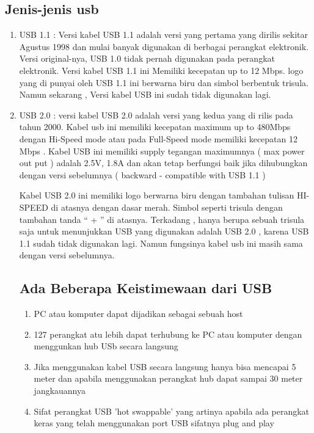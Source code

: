 \subsection {Jenis-jenis usb}
\begin {enumerate}
\item
	USB 1.1 : Versi kabel USB 1.1 adalah versi yang pertama yang dirilis sekitar Agustus 1998 dan mulai banyak digunakan di berbagai perangkat elektronik. Versi original-nya, USB 1.0 tidak pernah digunakan pada perangkat elektronik. Versi kabel USB 1.1 ini Memiliki kecepatan up to 12 Mbps. logo yang di punyai oleh USB 1.1 ini berwarna biru dan simbol berbentuk trisula. Namun sekarang , Versi kabel USB ini sudah tidak digunakan lagi.
\item
	USB 2.0 : versi kabel USB 2.0 adalah versi yang kedua yang di rilis pada tahun 2000. Kabel usb ini memiliki kecepatan maximum up to 480Mbps dengan Hi-Speed mode atau pada Full-Speed mode memiliki kecepatan 12 Mbps . Kabel USB ini memiliki supply tegangan maximumnya ( max power out put ) adalah 2.5V, 1.8A dan akan tetap berfungsi baik jika dihubungkan dengan versi sebelumnya ( backward - compatible with USB 1.1 )
	
	Kabel USB 2.0 ini memiliki logo berwarna biru dengan tambahan tulisan HI-SPEED di atasnya dengan dasar merah. Simbol seperti trisula dengan tambahan tanda “ + ” di atasnya. Terkadang , hanya berupa sebuah trisula saja untuk menunjukkan USB yang digunakan adalah USB 2.0 , karena USB 1.1 sudah tidak digunakan lagi. Namun fungsinya kabel usb ini masih sama dengan versi sebelumnya.
	
\subsection {Ada Beberapa Keistimewaan dari USB}
\begin {enumerate}
\item
 PC atau komputer dapat dijadikan sebagai sebuah host
\item
 127 perangkat atu lebih dapat terhubung ke PC atau komputer dengan menggunkan hub USb secara langsung
\item
 Jika menggunakan kabel USB secara langsung hanya bisa mencapai 5 meter dan apabila menggunakan perangkat hub dapat sampai 30 meter jangkauannya
\item
 Sifat perangkat USB 'hot swappable' yang artinya apabila ada perangkat keras yang telah menggunakan port USB sifatnya plug and play
\end {enumerate}	


\end{enumerate}
